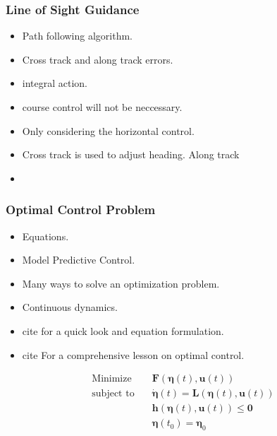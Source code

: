 \subsubsection*{Line of Sight Guidance}
\begin{itemize}
    \item Path following algorithm.
    \item Cross track and along track errors.
    \item integral action.
    \item course control will not be neccessary.
    \item Only considering the horizontal control.
    \item Cross track is used to adjust heading. Along track
    \item \cite{lekkas2013line}
\end{itemize}



\subsubsection*{Optimal Control Problem}
\begin{itemize}
    \item Equations.
    \item Model Predictive Control.
    \item Many ways to solve an optimization problem.
    \item Continuous dynamics.
    \item cite \cite{breivik2017mpc} for a quick look and equation formulation.
    \item cite \cite{wright1999numerical} For a comprehensive lesson on optimal control.
\end{itemize}

\begin{subequations}
    \label{eq:OCP description}
\begin{align}
    \textrm{Minimize} \quad & \textbf{F}(\boldsymbol{\eta}(t), \textbf{u}(t)) \label{eq:OCP-a} \\ 
    \textrm{subject to} \quad & \dot{\boldsymbol{\eta}}(t) = \textbf{L}(\boldsymbol{\eta}(t), \textbf{u}(t)) \label{eq:OCP-b} \\
    \quad & \textbf{h}(\boldsymbol{\eta}(t), \textbf{u}(t)) \leq \textbf{0} \label{eq:OCP-c}\\
    \quad & \boldsymbol{\eta}(t_0) = \boldsymbol{\eta}_0 \label{eq:OCP-d}
\end{align}
\end{subequations}


